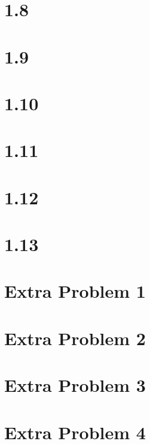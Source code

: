 \documentclass[10pt]{mypackage}
\begin{document}
\RaggedRight
\section{1.8}%
\section{1.9}%
\section{1.10}%
\section{1.11}%
\section{1.12}%
\section{1.13}%
\section{Extra Problem 1}%
\section{Extra Problem 2}%
\section{Extra Problem 3}%
\section{Extra Problem 4}%
\end{document}
